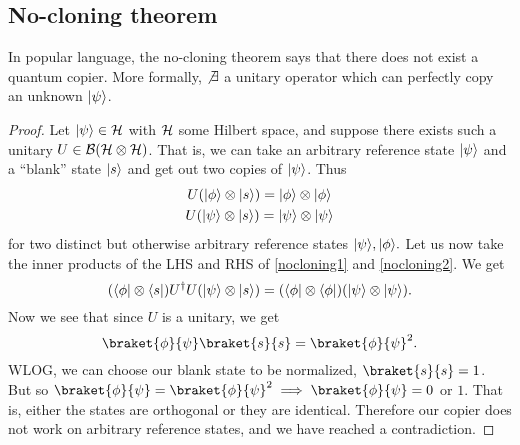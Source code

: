 \subsection*{No-cloning theorem} In popular language, the no-cloning theorem says that there does not exist a quantum copier. More formally, $\not\exists$ a unitary operator which can perfectly copy an unknown $\lvert\psi\rangle$.

\begin{proof}
    Let $\lvert\psi\rangle\in \mathcal H$ with $\mathcal H$ some Hilbert space, and suppose there exists such a unitary $U\in\mathcal{B}(\mathcal H\otimes \mathcal H)$. That is, we can take an arbitrary reference state $\lvert\psi\rangle$ and a ``blank'' state $\lvert s\rangle$ and get out two copies of $\lvert\psi\rangle$. Thus
    \begin{gather}
        U(\lvert\phi\rangle\otimes \lvert s\rangle)=\lvert\phi\rangle \otimes \lvert\phi\rangle\label{nocloning1}\\
        U(\lvert\psi\rangle\otimes \lvert s\rangle)= \lvert\psi\rangle\otimes \lvert\psi\rangle\label{nocloning2}
    \end{gather}
    for two distinct but otherwise arbitrary reference states $\lvert\psi\rangle, \lvert\phi\rangle.$
    Let us now take the inner products of the LHS and RHS of \ref{nocloning1} and \ref{nocloning2}. We get
    \begin{equation}
        (\langle\phi\rvert\otimes \langle s\rvert)U^\dagger U (\lvert\psi\rangle\otimes \lvert s\rangle) =(\langle\phi\rvert \otimes \langle\phi\rvert)(\lvert\psi\rangle\otimes \lvert\psi\rangle).
    \end{equation}
    Now we see that since $U$ is a unitary, we get
    \begin{equation}
        \braket{\phi}{\psi}\braket{s}{s}=\braket{\phi}{\psi}^2.
    \end{equation}
    WLOG, we can choose our blank state to be normalized, $\braket{s}{s}=1$. But so $\braket{\phi}{\psi}=\braket{\phi}{\psi}^2\implies \braket{\phi}{\psi}=0$ or $1$. That is, either the states are orthogonal or they are identical. Therefore our copier does not work on arbitrary reference states, and we have reached a contradiction.
\end{proof}

